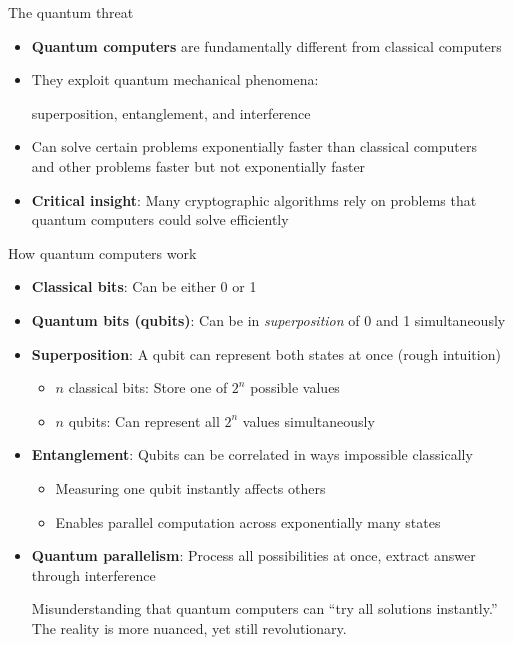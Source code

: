 \documentclass[aspectratio=169, lualatex]{beamer} %
\def\envert#1{\textcolor{vert}{#1}}
\begin{document}
\begin{frame}{The quantum threat}
	\begin{itemize}
		\item \textbf{Quantum computers} are fundamentally different from classical computers
		\item They exploit quantum mechanical phenomena: 
		
		\begin{center}\envert{superposition, entanglement, and interference}
		\end{center}\pause
		\item Can solve certain problems exponentially faster than classical computers \\
		\envert{and other problems faster but not exponentially faster}\pause
		\item \textbf{Critical insight}: Many cryptographic algorithms rely on problems that quantum computers could solve efficiently
	\end{itemize}
\end{frame}

\begin{frame}{How quantum computers work}
	\begin{itemize}
		\item \textbf{Classical bits}: Can be either 0 or 1
		\item \textbf{Quantum bits (qubits)}: Can be in \textit{superposition} of 0 and 1 simultaneously
		\item \textbf{Superposition}: A qubit can represent both states at once \envert{(rough intuition)}
		      \begin{itemize}
			      \item $n$ classical bits: Store one of $2^n$ possible values
			      \item $n$ qubits: Can represent all $2^n$ values simultaneously
		      \end{itemize}\pause
		\item \textbf{Entanglement}: Qubits can be correlated in ways impossible classically
		      \begin{itemize}
			      \item Measuring one qubit instantly affects others
			      \item Enables parallel computation across exponentially many states
		      \end{itemize}
		\item \textbf{Quantum parallelism}: Process all possibilities at once, extract answer through interference \pause
		
\envert{Misunderstanding that quantum computers can “try all solutions instantly.” The reality is more nuanced, yet still revolutionary.}
	\end{itemize}
\end{frame}
\end{document}
